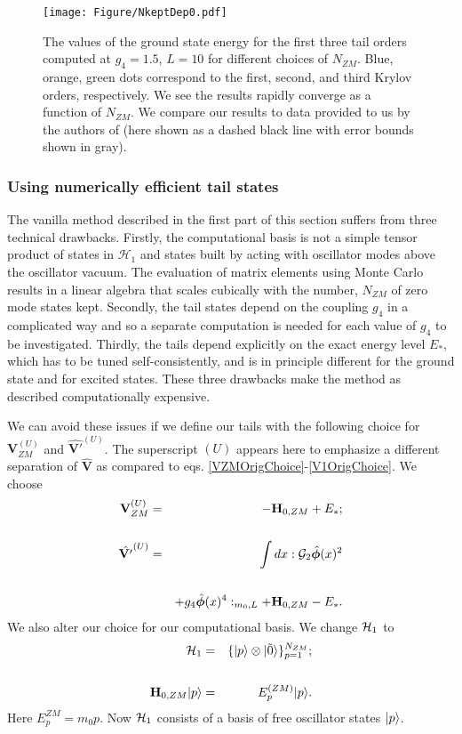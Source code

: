 \documentclass[twocolumn,secnumarabic,amssymb, nobibnotes, aps, prd]{revtex4-2}
\newcommand{\bea}{\begin{eqnarray}}
\newcommand{\eea}{\end{eqnarray}}
\begin{document}
 \begin{figure}
    \centering
     \texttt{[image: Figure/NkeptDep0.pdf]}

    \caption{
    The values of the ground state energy for the first three tail orders computed at $g_4=1.5$, $L=10$ for different choices of $N_{ZM}$.
    Blue, orange, green dots correspond to the first, second, and third Krylov orders, respectively. We see the results rapidly converge as a function of $N_{ZM}$.  We compare our results to data provided to us by the authors of \cite{Elias-Miro:2017tup} (here shown as a dashed black line with error bounds shown in gray).
\label{unapproximated_tails}}
\end{figure}




\subsubsection{Using numerically efficient tail states}
The vanilla method described in the first part of this section suffers from three technical drawbacks. Firstly, the computational basis is not a simple tensor product of states in $\mathcal{H}_1$ and states built by acting with oscillator modes above the oscillator vacuum.  The evaluation of matrix elements using Monte Carlo results in a linear algebra that scales cubically with the number, $N_{ZM}$ of zero mode states kept. Secondly, the tail states depend on the coupling $g_4$ in a complicated way and so a separate computation is needed for each value of $g_4$ to be investigated. Thirdly, the tails depend explicitly on the exact energy level $E_*$, which has to be tuned self-consistently, and is in principle different for the ground state and for excited states. These three drawbacks make the method as described computationally expensive. 

We can avoid these issues if we define our tails with the following choice for $\mathbf{V}_{ZM}^{(U)}$ and $\hat{\mathbf{V'}}^{(U)}$.  The superscript $(U)$ appears here to emphasize a different separation of $\hat{\mathbf{V}}$ as compared to eqs. \eqref{VZMOrigChoice}-\eqref{V1OrigChoice}.
We choose 
\bea
\mathbf{V}_{ZM}^{(U)} &=&-\mathbf{H}_{0,ZM}+E_*\label{NumEffVZM};\cr\cr
\hat{\mathbf{ V'}}^{(U)} &=& \intop dx :\mathcal{G}_2 \hat{\boldsymbol{\phi}}(x)^2 
\cr\cr 
&& + g_4 \hat{\boldsymbol{\phi}}(x)^4:_{m_0,L} +\mathbf{H}_{0,ZM}-E_*.
\eea
We also alter our choice for our computational basis.  We change ${\cal H}_1$ to 
\begin{eqnarray}
\mathcal{H}_1 &=& \{\ket{p}\otimes\ket{\tilde{0}}\}^{N_{ZM}}_{p=1};\cr\cr
\mathbf{H}_{0,ZM}|p\rangle &=& E_p^{(ZM)}|p\rangle.
\end{eqnarray}
Here $E^{ZM}_p = m_0p$.
Now ${\cal H}_1$ consists of a basis of free oscillator states $\ket{p}$.
\end{document}
